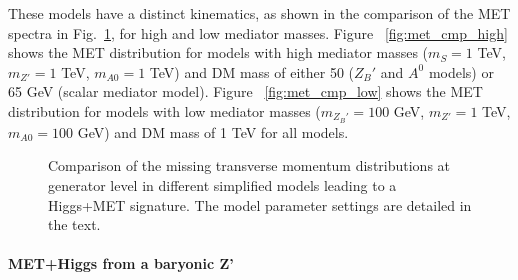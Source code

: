 These models have a distinct kinematics, as shown in the comparison of the 
MET spectra in Fig.~\ref{fig:METSimpMonoHiggs}, for high and low mediator masses. 
Figure ~\ref{fig:met_cmp_high} shows the MET distribution 
for models with high mediator masses ($m_{S} = 1$ TeV, $m_{Z'} = 1$ TeV, $m_{A0} = 1$ TeV)
and DM mass of either 50 ($Z_B'$ and $A^0$ models) or 65 GeV (scalar mediator model).
Figure ~\ref{fig:met_cmp_low} shows the MET distribution 
for models with low mediator masses ($m_{Z_B'} = 100$ GeV, $m_{Z'} = 1$ TeV, $m_{A0} = 100$ GeV)
and DM mass of 1 TeV for all models. 

\begin{figure}[hbpt!]
	\centering
	\caption{Comparison of the missing transverse momentum distributions at generator level in different 
		simplified models leading to a Higgs+MET signature. The model parameter settings are detailed in the text.
		\label{fig:METSimpMonoHiggs}}
\end{figure}


\paragraph{MET+Higgs from a baryonic Z'}

